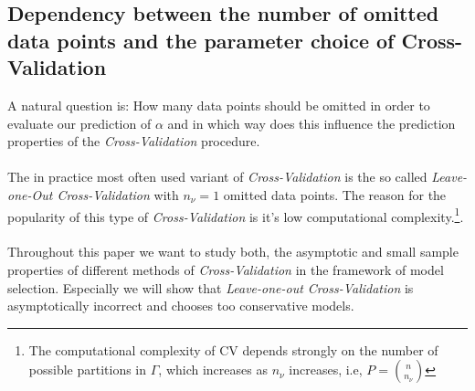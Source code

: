\documentclass[Research_Module_ES.tex]{subfiles}
\begin{document}
\subsection{Dependency between the number of omitted data points and the  parameter choice of Cross-Validation}
A natural question is: How many data points should be omitted in order to evaluate our prediction of $\alpha$ and in which way does this influence the prediction properties of the \textit{Cross-Validation} procedure.\\
\\
The in practice most often used variant of \textit{Cross-Validation} is the so called \textit{ Leave-one-Out Cross-Validation} with $n_\nu=1$ omitted data points. The reason for the popularity of this type of \textit{Cross-Validation} is it's low computational complexity.\footnote{The computational complexity of CV depends strongly on the number of possible partitions in $\Gamma$, which increases as $n_\nu$ increases, i.e,
$P=\binom{n}{n_\nu}$}.\\
\\
Throughout this paper we want to study both, the asymptotic and small sample properties of different methods of \textit{Cross-Validation} in the framework of model selection. Especially we will show that \textit{ Leave-one-out Cross-Validation} is asymptotically incorrect and chooses too conservative models.
\end{document}
